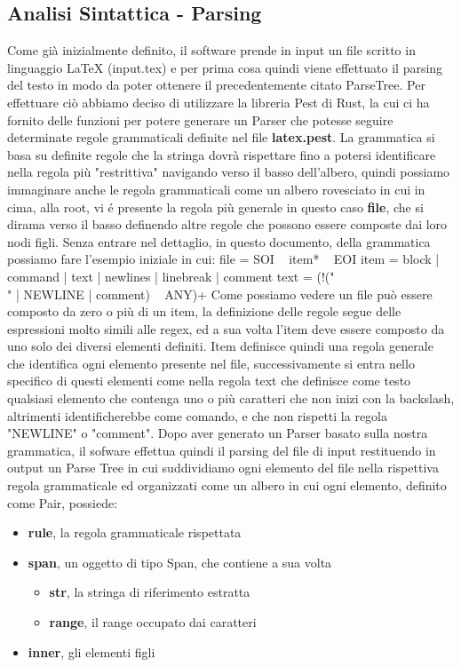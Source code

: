 ﻿\documentclass{article}
\begin{document}
    \subsection{Analisi Sintattica - Parsing}
    Come già inizialmente definito, il software prende in input un file scritto in linguaggio LaTeX (input.tex) e per prima cosa quindi viene effettuato il parsing del testo in modo da poter ottenere il precedentemente citato ParseTree. Per effettuare ciò abbiamo deciso di utilizzare la libreria Pest di Rust, la cui ci ha fornito delle funzioni per potere generare un Parser che potesse seguire determinate regole grammaticali definite nel file \textbf{latex.pest}. La grammatica si basa su definite regole che la stringa dovrà rispettare fino a potersi identificare nella regola più "restrittiva" navigando verso il basso dell'albero, quindi possiamo immaginare anche le regola grammaticali come un albero rovesciato in cui in cima, alla root, vi é presente la regola più generale in questo caso \textbf{file}, che si dirama verso il basso definendo altre regole che possono essere composte dai loro nodi figli. Senza entrare nel dettaglio, in questo documento, della grammatica possiamo fare l'esempio iniziale in cui:
    file = { SOI ~ item* ~ EOI }
    item = { block | command | text | newlines | linebreak | comment }
    text = { (!("\\" | NEWLINE | comment) ~ ANY)+ }
    Come possiamo vedere un file può essere composto da zero o più di un item, la definizione delle regole segue delle espressioni molto simili alle regex, ed a sua volta l'item deve essere composto da uno solo dei diversi elementi definiti. Item definisce quindi una regola generale che identifica ogni elemento presente nel file, successivamente si entra nello specifico di questi elementi come nella regola text che definisce come testo qualsiasi elemento che contenga uno o più caratteri che non inizi con la backslash, altrimenti identificherebbe come comando, e che non rispetti la regola "NEWLINE" o "comment".
    Dopo aver generato un Parser basato sulla nostra grammatica, il sofware effettua quindi il parsing del file di input restituendo in output un Parse Tree in cui suddividiamo ogni elemento del file nella rispettiva regola grammaticale ed organizzati come un albero in cui ogni elemento, definito come Pair, possiede:
    \begin{itemize}
        \item \textbf{rule}, la regola grammaticale rispettata
        \item \textbf{span}, un oggetto di tipo Span, che contiene a sua volta \begin{itemize}
                                                                                   \item \textbf{str}, la stringa di riferimento estratta
                                                                                   \item \textbf{range}, il range occupato dai caratteri
        \end{itemize}
        \item \textbf{inner}, gli elementi figli
    \end{itemize}
\end{document}

